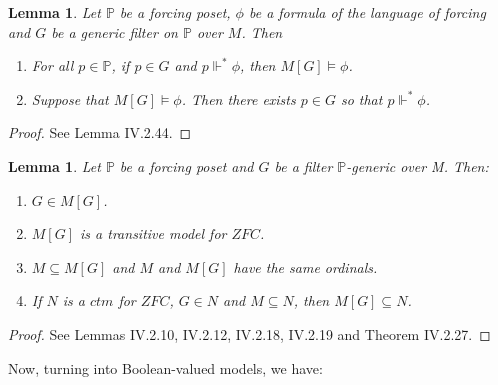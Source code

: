 \documentclass[10pt,longbibliography]{article}
\newtheorem{Lemma}[Theo]{Lemma}
\newcommand{\Po}{\mathbb{P}}
\newcommand{\forces}{\Vdash^{*}}
\begin{document}
\begin{Lemma}\label{forcingwithposetslemma}
	Let $\Po$ be a forcing poset, $\phi$ be a formula of the language of forcing and $G$ be a generic filter on $\Po$ over $M$. Then
	\begin{enumerate}
		\item For all $p \in \Po$, if $p \in G$ and $p \forces \phi$, then $M[G] \models \phi$. 
		\item Suppose that $M[G] \models \phi$. Then there exists $p \in G$ so that $p \forces \phi$.
	\end{enumerate}
\end{Lemma}
\begin{proof}
	See \cite{Kunen11} Lemma IV.2.44.
\end{proof}


\begin{Lemma}\label{extensaoncrescemt}
	Let $\Po$ be a forcing poset and $G$ be a filter $\Po$-generic over M. Then:
	\begin{enumerate}
		\item $G \in M[G]$.
		\item $M[G]$ is a transitive model for $ZFC$.
		\item $M \subseteq M[G]$ and $M$ and $M[G]$ have the same ordinals. 
		\item If $N$ is a $ctm$ for $ZFC$, $G \in N$ and $M \subseteq N$, then $M[G] \subseteq N$.
	\end{enumerate}
\end{Lemma}
\begin{proof}
	See \cite{Kunen11} Lemmas IV.2.10, IV.2.12, IV.2.18, IV.2.19 and Theorem IV.2.27.
\end{proof}


Now, turning into Boolean-valued models, we have:
\end{document}
